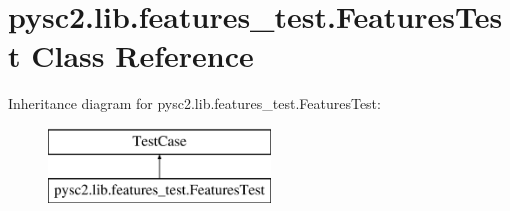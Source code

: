 \hypertarget{classpysc2_1_1lib_1_1features__test_1_1_features_test}{}\section{pysc2.\+lib.\+features\+\_\+test.\+Features\+Test Class Reference}
\label{classpysc2_1_1lib_1_1features__test_1_1_features_test}
Inheritance diagram for pysc2.\+lib.\+features\+\_\+test.\+Features\+Test\+:\begin{figure}[H]
\begin{center}
\leavevmode
\includegraphics[height=2.000000cm]{classpysc2_1_1lib_1_1features__test_1_1_features_test}
\end{center}
\end{figure}
